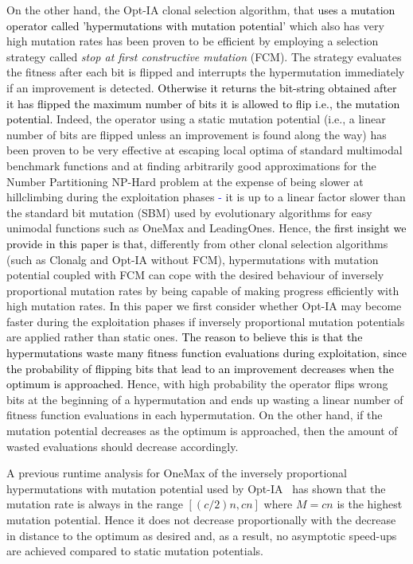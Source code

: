 \documentclass[lettersize,journal]{IEEEtran}
\newcommand{\new}[1]{\textcolor{black}{#1}}
\newcommand{\rev}[1]{\textcolor{blue}{#1}}
\begin{document}
On the other hand, the Opt-IA clonal selection algorithm, that \new{uses a mutation operator called 'hypermutations with mutation potential'} which also has very high mutation rates has been proven to be efficient by employing a selection strategy called {\it stop at first constructive mutation} (FCM). The strategy evaluates the fitness after each bit is flipped and interrupts the hypermutation immediately if an improvement is detected. \new {Otherwise it returns the bit-string obtained after it has flipped the maximum number of  bits it is allowed to flip i.e., the mutation potential.} 
Indeed, the operator using a static mutation potential (i.e., a linear number of bits are flipped unless an improvement is found along the way) has been proven to be very effective at escaping local
optima of standard multimodal benchmark functions \cite{CorusOlivetoYazdani2019TCS} and at finding arbitrarily good approximations for the Number Partitioning NP-Hard problem \cite{CorusOlivetoYazdaniPPSN2018Approx,CorusOlivetoYazdaniAIJ2019} at the expense
of being slower at hillclimbing during the exploitation phases \rev{-} it is up to a linear factor slower than the standard bit mutation (SBM) used by evolutionary algorithms for easy unimodal functions such as OneMax and LeadingOnes.
Hence, \new{the first insight we provide in this paper is that,} differently from other clonal selection algorithms (such as Clonalg and Opt-IA without FCM), hypermutations with mutation potential coupled with FCM can cope with the desired behaviour of inversely proportional mutation rates by being capable of making progress efficiently with high mutation rates. 
In this paper we first consider whether Opt-IA may become faster during the exploitation phases if inversely proportional mutation potentials are applied rather than static ones.
\new{The reason to believe this is that the hypermutations waste many fitness function evaluations during exploitation, since the probability of flipping bits that lead to an improvement decreases when the optimum is approached.} 
Hence, with high probability the operator flips wrong bits at the beginning of a hypermutation and ends up wasting a linear number
of fitness function evaluations in each hypermutation. On the other hand, if the mutation potential decreases as the optimum is approached, 
then the amount of wasted evaluations should decrease accordingly.

A previous runtime analysis for OneMax of the inversely proportional hypermutations with mutation potential used by Opt-IA~\cite{JansenZarges2011} has shown that the mutation rate is always in the range $[(c/2)n, cn]$ where $M=cn$ is the highest mutation potential. Hence it does not decrease proportionally with the decrease in distance to the optimum as desired and, as a result, no asymptotic speed-ups are achieved compared to static mutation potentials. 
\end{document}
